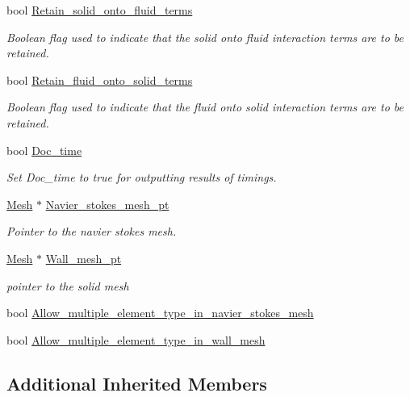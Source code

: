 \begin{DoxyCompactItemize}
bool \hyperlink{classoomph_1_1FSIPreconditioner_acecba46494b0aa6f2035020f53be634c}{Retain\+\_\+solid\+\_\+onto\+\_\+fluid\+\_\+terms}
\begin{DoxyCompactList}\small\item\em Boolean flag used to indicate that the solid onto fluid interaction terms are to be retained. \end{DoxyCompactList}\item 
bool \hyperlink{classoomph_1_1FSIPreconditioner_ada9ff0aa8a1b15dea196a6d753ec740e}{Retain\+\_\+fluid\+\_\+onto\+\_\+solid\+\_\+terms}
\begin{DoxyCompactList}\small\item\em Boolean flag used to indicate that the fluid onto solid interaction terms are to be retained. \end{DoxyCompactList}\item 
bool \hyperlink{classoomph_1_1FSIPreconditioner_a405ccaf05553b1bf7702cb2f25df57e9}{Doc\+\_\+time}
\begin{DoxyCompactList}\small\item\em Set Doc\+\_\+time to true for outputting results of timings. \end{DoxyCompactList}\item 
\hyperlink{classoomph_1_1Mesh}{Mesh} $\ast$ \hyperlink{classoomph_1_1FSIPreconditioner_a201e3fcf3e13bd19b3871e9d3a734a1d}{Navier\+\_\+stokes\+\_\+mesh\+\_\+pt}
\begin{DoxyCompactList}\small\item\em Pointer to the navier stokes mesh. \end{DoxyCompactList}\item 
\hyperlink{classoomph_1_1Mesh}{Mesh} $\ast$ \hyperlink{classoomph_1_1FSIPreconditioner_ae86cf988796524f905c8d6edc942816a}{Wall\+\_\+mesh\+\_\+pt}
\begin{DoxyCompactList}\small\item\em pointer to the solid mesh \end{DoxyCompactList}\item 
bool \hyperlink{classoomph_1_1FSIPreconditioner_a4c015d18092bf2bfc1db075c74006e80}{Allow\+\_\+multiple\+\_\+element\+\_\+type\+\_\+in\+\_\+navier\+\_\+stokes\+\_\+mesh}
\item 
bool \hyperlink{classoomph_1_1FSIPreconditioner_a87e5a1cb279243414b1b0c2a5834efb5}{Allow\+\_\+multiple\+\_\+element\+\_\+type\+\_\+in\+\_\+wall\+\_\+mesh}
\end{DoxyCompactItemize}
\subsection*{Additional Inherited Members}


